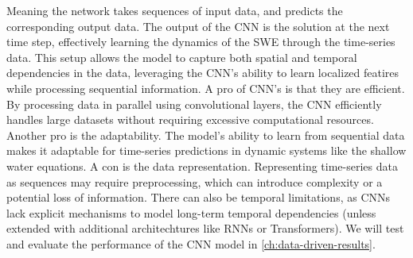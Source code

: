 Meaning the network takes sequences of input data, and predicts the corresponding output data.
The output of the CNN is the solution at the next time step, effectively learning the dynamics of the SWE through the time-series data.
This setup allows the model to capture both spatial and temporal dependencies in the data, leveraging the CNN's ability to learn localized featires while processing sequential information.
A pro of CNN's is that they are efficient. By processing data in parallel using convolutional layers, the CNN efficiently handles large datasets without requiring excessive computational resources.
Another pro is the adaptability. 
The model's ability to learn from sequential data makes it adaptable for time-series predictions in dynamic systems like the shallow water equations.
A con is the data representation. Representing time-series data as sequences may require preprocessing, which can introduce complexity or a potential loss of information.
There can also be temporal limitations, as CNNs lack explicit mechanisms to model long-term temporal dependencies (unless extended with additional architechtures like RNNs or Transformers).
We will test and evaluate the performance of the CNN model in \autoref{ch:data-driven-results}.





